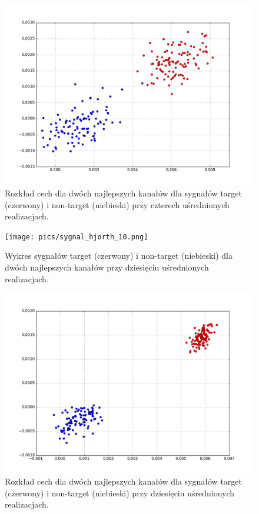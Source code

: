 \documentclass[licencjacka,openright]{pracamgr}
\begin{document}
\begin{figure}[H]
\centering
\includegraphics[scale=0.55, trim=0mm 0mm 0mm 0mm, clip=True]{pics/cecha_hjorth_4.png}
\caption{Rozkład cech dla dwóch najlepszych kanałów dla sygnałów target (czerwony) i non-target (niebieski) przy czterech uśrednionych realizacjach.}
\label{cecha_hjorth_4}
\end{figure}

\begin{figure}[H]
\centering
\texttt{[image: pics/sygnal\_hjorth\_10.png]}
\caption{Wykres sygnałów target (czerwony) i non-target (niebieski) dla dwóch najlepszych kanałów przy dziesięciu uśrednionych realizacjach.}
\label{sygnal_hjorth_10}
\end{figure}

\begin{figure}[H]
\centering
\includegraphics[scale=0.55, trim=0mm 0mm 0mm 0mm, clip=True]{pics/cecha_hjorth_10.png}
\caption{Rozkład cech dla dwóch najlepszych kanałów dla sygnałów target (czerwony) i non-target (niebieski) przy dziesięciu uśrednionych realizacjach.}
\label{cecha_hjorth_10}
\end{figure}
\end{document}
